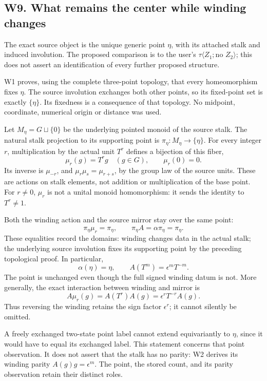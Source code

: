 \documentclass[
  11pt,
]{article}
\begin{document}
\subsection{W9. What remains the center while winding
changes}\label{w9.-what-remains-the-center-while-winding-changes}

The exact source object is the unique generic point \(\eta\), with its
attached stalk and induced involution. The proposed comparison is to the
user's \(\tau\langle Z_1;\text{no }Z_2\rangle\); this does not assert an
identification of every further proposed structure.

W1 proves, using the complete three-point topology, that every
homeomorphism fixes \(\eta\). The source involution exchanges both other
points, so its fixed-point set is exactly \(\{\eta\}\). Its fixedness is
a consequence of that topology. No midpoint, coordinate, numerical
origin or distance was used.

Let \(M_\eta=G\sqcup\{0\}\) be the underlying pointed monoid of the
source stalk. The natural stalk projection to its supporting point is
\(\pi_\eta:M_\eta\to\{\eta\}\). For every integer \(r\), multiplication
by the actual unit \(T^r\) defines a bijection of this fiber, \[
\mu_r(g)=T^r g\quad(g\in G),\qquad \mu_r(0)=0.
\] Its inverse is \(\mu_{-r}\), and \(\mu_r\mu_s=\mu_{r+s}\), by the
group law of the source units. These are actions on stalk elements, not
addition or multiplication of the base point. For \(r\ne0\), \(\mu_r\)
is not a unital monoid homomorphism: it sends the identity to
\(T^r\ne1\).

Both the winding action and the source mirror stay over the same point:
\[
\pi_\eta\mu_r=\pi_\eta,\qquad
\pi_\eta A=\alpha\pi_\eta=\pi_\eta.
\] These equalities record the domains: winding changes data in the
actual stalk; the underlying source involution fixes its supporting
point by the preceding topological proof. In particular, \[
\alpha(\eta)=\eta,\qquad A(T^m)=\epsilon^mT^{-m}.
\] The point is unchanged even though the full signed winding datum is
not. More generally, the exact interaction between winding and mirror is
\[
A\mu_r(g)=A(T^r)A(g)=\epsilon^rT^{-r}A(g).
\] Thus reversing the winding retains the sign factor \(\epsilon^r\); it
cannot silently be omitted.

A freely exchanged two-state point label cannot extend equivariantly to
\(\eta\), since it would have to equal its exchanged label. This
statement concerns that point observation. It does not assert that the
stalk has no parity: W2 derives its winding parity \(A(g)g=\epsilon^m\).
The point, the stored count, and its parity observation retain their
distinct roles.
\end{document}
